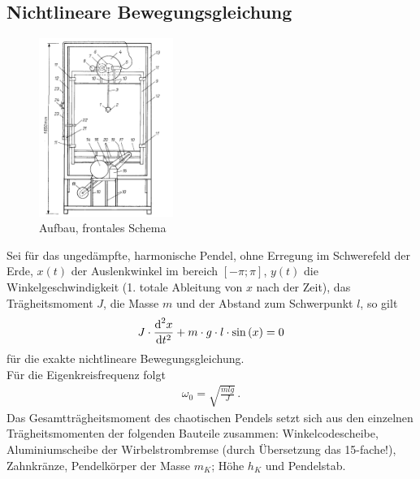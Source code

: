 \documentclass[numbers=noenddot,12pt,a4paper]{scrartcl}
\newcommand{\diff}{\textnormal{d}}
\begin{document}
\subsection{Nichtlineare Bewegungsgleichung}
\begin{figure}
\includegraphics[width=0.39\textwidth]{pendel.png}
\caption{Aufbau, frontales Schema}
\label{img:aufbau}
\end{figure}
Sei für das ungedämpfte, harmonische Pendel, ohne Erregung im Schwerefeld der Erde, $x(t)$ der Auslenkwinkel im bereich $\left[-\pi; \pi\right]$, $y(t)$ die Winkelgeschwindigkeit (1. totale Ableitung von $x$ nach der Zeit), das Trägheitsmoment $J$, die Masse $m$ und der Abstand zum Schwerpunkt $l$, so gilt
\begin{align}
J\cdot \frac{\diff^2 x}{\diff t^2}+m\cdot g\cdot l\cdot  \sin\left(x\right)=0
\end{align}
für die exakte nichtlineare Bewegungsgleichung.\\
Für die Eigenkreisfrequenz folgt
\begin{align}
\omega_0=\sqrt{\frac{mlg}{J}} \, . \label{eq:freq}
\end{align}
Das Gesamtträgheitsmoment des chaotischen Pendels setzt sich aus den einzelnen Trägheitsmomenten der folgenden Bauteile zusammen: Winkelcodescheibe, Aluminiumscheibe der Wirbelstrombremse (durch Übersetzung das 15-fache!), Zahnkränze, Pendelkörper der Masse $m_K$; Höhe $h_K$ und Pendelstab.
\end{document}
